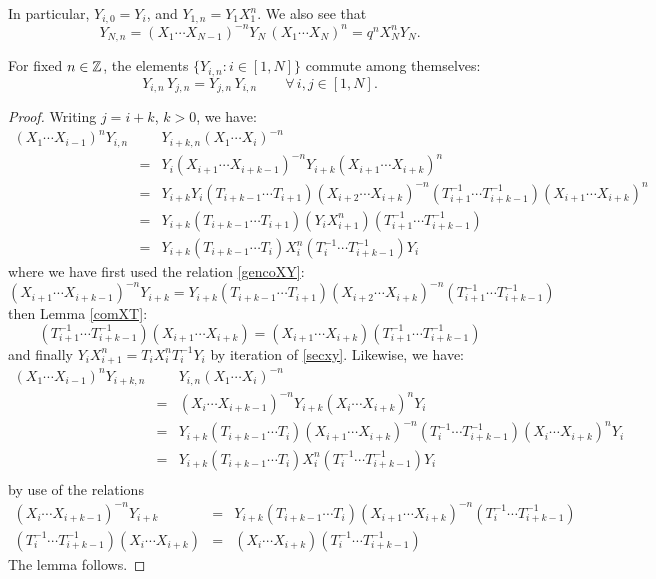 In particular, $Y_{i,0}=Y_i$, and $Y_{1,n}=Y_1 X_1^n$. We also see that
$$Y_{N,n}=(X_1\cdots X_{N-1})^{-n}Y_{N}\,(X_1\cdots X_N)^n=q^nX_N^n Y_N.$$

\begin{lemma}\label{commuYin}
For fixed $n\in {\mathbb Z}$, the elements $\{Y_{i,n}: i\in[1,N]\}$ commute among themselves:
$$Y_{i,n}\, Y_{j,n}=Y_{j,n}\, Y_{i,n}\qquad \forall\, i,j\in[1,N].$$
\end{lemma}
\begin{proof}
Writing $j=i+k$, $k>0$, we have:
\begin{eqnarray*}
(X_1\cdots X_{i-1})^nY_{i,n}&& \!\!\!\!\!\!\!\!\!\!\!\!\!\! Y_{i+k,n}(X_1\cdots X_{i})^{-n}\\
&=&Y_i (X_{i+1}\cdots X_{i+k-1})^{-n}Y_{i+k} (X_{i+1}\cdots X_{i+k})^n\\
&=& Y_{i+k}Y_i  (T_{i+k-1}\cdots T_{i+1})(X_{i+2}\cdots X_{i+k})^{-n} 
(T_{i+1}^{-1}\cdots T_{i+k-1}^{-1})(X_{i+1}\cdots X_{i+k})^n\\
&=&  Y_{i+k}(T_{i+k-1}\cdots T_{i+1}) (Y_i  X_{i+1}^n) (T_{i+1}^{-1}\cdots T_{i+k-1}^{-1})\\
&=&  Y_{i+k}(T_{i+k-1}\cdots T_i)X_i^n(T_i^{-1}\cdots T_{i+k-1}^{-1})Y_i 
\end{eqnarray*}
where we have first used the relation \eqref{gencoXY}:
$$(X_{i+1}\cdots X_{i+k-1})^{-n}Y_{i+k}=Y_{i+k}(T_{i+k-1}\cdots T_{i+1})(X_{i+2}\cdots X_{i+k})^{-n} 
(T_{i+1}^{-1}\cdots T_{i+k-1}^{-1})$$
then Lemma \ref{comXT}:
$$(T_{i+1}^{-1}\cdots T_{i+k-1}^{-1})(X_{i+1}\cdots X_{i+k})=(X_{i+1}\cdots X_{i+k})(T_{i+1}^{-1}\cdots T_{i+k-1}^{-1})$$
and finally $Y_i  X_{i+1}^n=T_iX_i^nT_i^{-1} Y_i$ by iteration of \eqref{secxy}.
Likewise, we have:
\begin{eqnarray*}
(X_1\cdots X_{i-1})^nY_{i+k,n}&& \!\!\!\!\!\!\!\!\!\!\!\!\!\! Y_{i,n}(X_1\cdots X_{i})^{-n}\\
&=&(X_{i}\cdots X_{i+k-1})^{-n}Y_{i+k} (X_{i}\cdots X_{i+k})^{n}Y_i\\
&=&Y_{i+k} (T_{i+k-1}\cdots T_i)(X_{i+1}\cdots X_{i+k})^{-n}(T_i^{-1}\cdots T_{i+k-1}^{-1})(X_{i}\cdots X_{i+k})^{n}Y_i\\
&=&Y_{i+k} (T_{i+k-1}\cdots T_i)X_i^n (T_i^{-1}\cdots T_{i+k-1}^{-1})Y_i\\
\end{eqnarray*}
by use of the relations
\begin{eqnarray*}
(X_{i}\cdots X_{i+k-1})^{-n}Y_{i+k}&=& Y_{i+k}(T_{i+k-1}\cdots T_{i})(X_{i+1}\cdots X_{i+k})^{-n} 
(T_{i}^{-1}\cdots T_{i+k-1}^{-1})\\
(T_i^{-1}\cdots T_{i+k-1}^{-1})(X_{i}\cdots X_{i+k})&=& (X_{i}\cdots X_{i+k})(T_i^{-1}\cdots T_{i+k-1}^{-1})
\end{eqnarray*}
The lemma follows.
\end{proof}

